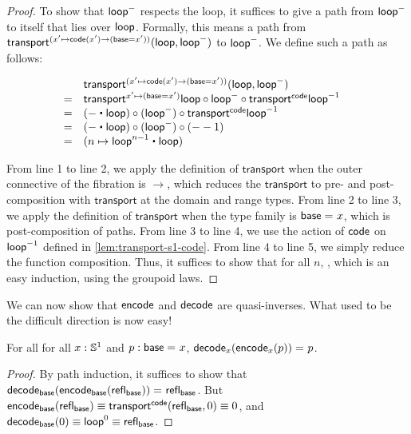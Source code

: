 \begin{proof}
To show that $\mathsf{loop}^-$ respects the loop, it suffices to give a path
from $\mathsf{loop}^-$ to itself that lies over $\mathsf{loop}$. 
Formally, this means a path from $\mathsf{transport}^{(x' \mapsto \mathsf{code}(x')
\rightarrow (\mathsf{base}=x'))}(\mathsf{loop},\mathsf{loop}^-)$ to $\mathsf{loop}^-$.  We define such a
path as follows:

\[
\begin{array}{lll}
  & \transfib {(x' \mapsto \code(x') \rightarrow (\base=x'))} \lloop {\lloop^-} & \\
= & \transfibf {x'\mapsto (\base=x')} \lloop \circ {\lloop^-} \circ \transfibf \code {\opp \lloop} & \\
= & (- \ct \lloop) \circ (\lloop^-) \circ \transfibf \code {\opp \lloop} & \\
= & (- \ct \lloop) \circ (\lloop^-) \circ (- - 1) & \\
= & (n \mapsto \lloop^{n - 1} \ct \lloop) \\                       
\end{array}
\]

From line 1 to line 2, we apply the definition of $\mathsf{transport}$
when the outer connective of the fibration is $\rightarrow$, which
reduces the $\mathsf{transport}$ to pre- and post-composition with
$\mathsf{transport}$ at the domain and range types.  From line 2 to line
3, we apply the definition of $\mathsf{transport}$ when the type family
is $\mathsf{base} =_{} x$, which is post-composition of paths.  From line 3 to
line 4, we use the action of $\mathsf{code}$ on $\mathord{{\mathsf{loop}}^{-1}}$ defined in
\autoref{lem:transport-s1-code}.  From line 4 to line 5, we simply
reduce the function composition.  Thus, it suffices to show that for all
$n$, , which is an easy
induction, using the groupoid laws.  
\end{proof}

We can now show that $\mathsf{encode}$ and $\mathsf{decode}$ are quasi-inverses.
What used to be the difficult direction is now easy!

\begin{lem} \label{lem:s1-decode-encode}  For all 
for all $x: \mathbb{S} ^1$ and $p : \mathsf{base} =_{} x$, $\mathsf{decode}_x({{\mathsf{encode}_x(p)}}) =_{} p$.  
\end{lem}

\begin{proof}
By path induction, it suffices to show that 
$\mathsf{decode}_{\mathsf{base}}({{\mathsf{encode}_{\mathsf{base}}(\mathsf{refl}_{\mathsf{base}})}}) =_{} \mathsf{refl}_{\mathsf{base}}$.
But
${\mathsf{encode}_{\mathsf{base}}(\mathsf{refl}_{\mathsf{base}})} \equiv 
 \mathsf{transport}^{\mathsf{code}}(\mathsf{refl}_{\mathsf{base}},0) \equiv 0$, and $\mathsf{decode}_{\mathsf{base}}(0)
 \equiv \mathsf{loop}^ 0 \equiv \mathsf{refl}_{\mathsf{base}}$.  
\end{proof}

